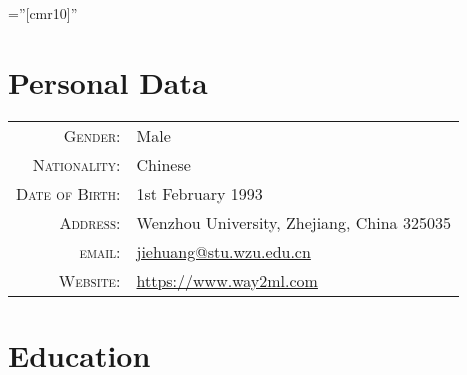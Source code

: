 \documentclass[a4paper,10pt]{article} %
\begin{document}
\font\fb=''[cmr10]'' %

\par{\bigskip\par} %

\section{Personal Data}

\begin{tabular}{rl}
\textsc{Gender:}                  	& Male \\
\textsc{Nationality:}               & Chinese \\
\textsc{Date of Birth:} 	        & 1st February 1993  \\
\textsc{Address:} 					& Wenzhou University, Zhejiang, China 325035  \\
\textsc{email:} 					& \href{mailto:jiehuang@stu.wzu.edu.cn}{jiehuang@stu.wzu.edu.cn} \\
\textsc{Website:}                   & \href{https://www.way2ml.com}{https://www.way2ml.com}\\
\end{tabular}



\section{Education}
\end{document}
